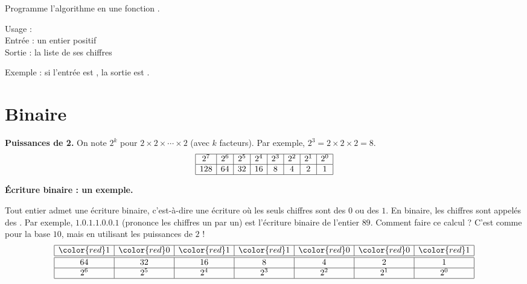 \documentclass[11pt,class=report,crop=false]{standalone}
\begin{document}
Programme l'algorithme en une fonction .

 
   \begin{fonction}
  Usage :  \\
  Entrée : un entier positif \\
  Sortie : la liste de ses chiffres
  
  \medskip
    
  Exemple : si l'entrée est , la sortie est \ci{[1,2,3,4]}.
  \end{fonction}


 



    
   \newpage
 

\section*{Binaire}

 \textbf{Puissances de 2.}
    On note $2^k$ pour $2 \times 2 \times \cdots \times 2$ (avec $k$ facteurs). Par exemple, $2^3 = 2 \times 2 \times 2 = 8$. 
$$
\begin{array}{|c|c|c|c|c|c|c|c|}
  \hline
  2^7  & 2^6 & 2^5 & 2^4 & 2^3 & 2^2 & 2^1 & 2^0 \\
  \hline
  128 & 64 & 32 & 16 & 8 & 4 & 2 & 1 \\ 
  \hline
\end{array}
$$

\bigskip

\textbf{\'Ecriture binaire : un exemple.}
  
    Tout entier admet une écriture binaire, c'est-à-dire une écriture où les seuls chiffres sont des $0$ ou des $1$. En binaire, les chiffres sont appelés des .
     Par exemple, $1.0.1.1.0.0.1$ (prononce les chiffres un par un) est l'écriture binaire de l'entier $89$. Comment faire ce calcul ? C'est comme pour la base $10$, mais en utilisant les puissances de $2$ ! 
$$
\begin{array}{|c|c|c|c|c|c|c|}
  \hline
  {\color{red}1} & {\color{red}0} & {\color{red}1} & {\color{red}1} & {\color{red}0} & {\color{red}0} & {\color{red}1} \\ 
  \hline\hline
  64 & 32 & 16  & 8 & 4 & 2 & 1 \\\hline
  2^6 & 2^5 & 2^4 & 2^3 & 2^2 & 2^1 & 2^0 \\
  \hline
\end{array}
$$
\end{document}
